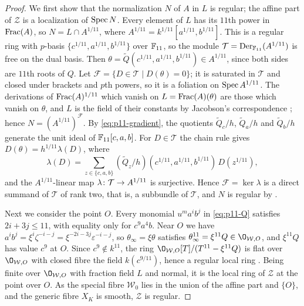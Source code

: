\begin{proof}
We first show that the normalization $N$ of $A$ in $L$ is regular; the affine part of $\mathcal Z$ is a localization of $\operatorname{Spec} N$.
Every element of $L$ has its $11$th power in $\operatorname{Frac}(A)$, so $N = L\cap A^{1/11}$, where $A^{1/11} = k^{1/11}[a^{1/11},b^{1/11}]$.
This is a regular ring with $p$-basis $\{c^{1/11},a^{1/11},b^{1/11}\}$ over $\mathbb{F}_{11}$, so the module $\mathcal T = \operatorname{Der}_{\mathbb{F}_{11}}(A^{1/11})$ is free on the dual basis.
Then $\theta = \widetilde Q(c^{1/11},a^{1/11},b^{1/11})\in A^{1/11}$, since both sides are $11$th roots of $Q$.
Let $\mathcal F = \{D\in\mathcal T\mid D(\theta) = 0\}$; it is saturated in $\mathcal T$ and closed under brackets and $p$th powers, so it is a foliation on $\operatorname{Spec} A^{1/11}$.
The derivations of $\operatorname{Frac}(A)^{1/11}$ which vanish on $L = \operatorname{Frac}(A)(\theta)$ are those which vanish on $\theta$, and $L$ is the field of their constants by Jacobson's correspondence \cite{Jac44}; hence $N = (A^{1/11})^{\mathcal F}$.
By \eqref{eq:p11-gradient}, the quotients $\widetilde Q_c/h$, $\widetilde Q_a/h$ and $\widetilde Q_b/h$ generate the unit ideal of $\mathbb{F}_{11}[c,a,b]$.
For $D\in\mathcal T$ the chain rule gives $D(\theta) = h^{1/11}\lambda(D)$, where
\[
  \lambda(D) = \sum_{z\in\{c,a,b\}}(\widetilde Q_z/h)(c^{1/11},a^{1/11},b^{1/11})\,D(z^{1/11}),
\]
and the $A^{1/11}$-linear map $\lambda\colon\mathcal T\to A^{1/11}$ is surjective.
Hence $\mathcal F = \ker\lambda$ is a direct summand of $\mathcal T$ of rank two, that is, a subbundle of $\mathcal T$, and $N$ is regular by \cite[Proposition~2.4]{Eke87}.

Next we consider the point $O$.
Every monomial $u^ma^ib^j$ in \eqref{eq:p11-Q} satisfies $2i+3j\leq 11$, with equality only for $c^9a^4b$.
Near $O$ we have $a^ib^j = \xi^i\zeta^{-i-j} = \xi^{-2i-3j}\varepsilon^{-i-j}$, so $\theta_\infty = \xi\theta$ satisfies $\theta_\infty^{11} = \xi^{11}Q\in\O_{\mathcal W,O}$, and $\xi^{11}Q$ has value $c^9$ at $O$.
Since $c^9\notin k^{11}$, the ring $\O_{\mathcal W,O}[T]/(T^{11}-\xi^{11}Q)$ is flat over $\O_{\mathcal W,O}$ with closed fibre the field $k(c^{9/11})$, hence a regular local ring \cite[Tag~]{Stacks}.
Being finite over $\O_{\mathcal W,O}$ with fraction field $L$ and normal, it is the local ring of $\mathcal Z$ at the point over $O$.
As the special fibre $\mathcal W_0$ lies in the union of the affine part and $\{O\}$, and the generic fibre $X_K$ is smooth, $\mathcal Z$ is regular.


\end{proof}

